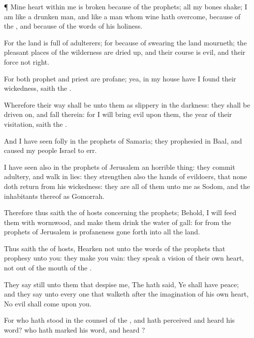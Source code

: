 {\par }{\PP {}¶ Mine
heart
within me is
broken because of the
prophets; all my
bones
shake; I am like a
drunken
man, and like a
man whom
wine hath
overcome,
because of the
{}, and because of the
words of his
holiness.

For the
land is
full of
adulterers; for
because of
swearing the
land
mourneth; the pleasant
places of the
wilderness are dried
up, and their
course is
evil, and their
force
{} not right.

For both
prophet and
priest are
profane; yea, in my
house have I
found their
wickedness,
saith the
{}.

Wherefore their
way shall be unto them as
slippery
{} in the
darkness: they shall be driven
on, and
fall therein: for I will
bring
evil upon them,
{} the
year of their
visitation,
saith the
{}.

And I have
seen
folly in the
prophets of
Samaria; they
prophesied in
Baal, and caused my
people
Israel to
err.

I have
seen also in the
prophets of
Jerusalem an horrible
thing: they commit
adultery, and
walk in
lies: they
strengthen also the
hands of
evildoers, that
none doth
return from his
wickedness: they are all of them unto me as
Sodom, and the
inhabitants thereof as
Gomorrah.

Therefore thus
saith the
{} of
hosts concerning the
prophets; Behold, I will
feed them with
wormwood, and make them
drink the
water of
gall: for from the
prophets of
Jerusalem is
profaneness gone
forth into all the
land.

Thus
saith the
{} of
hosts,
Hearken not unto the
words of the
prophets that
prophesy unto you: they make you
vain: they
speak a
vision of their own
heart,
{} not out of the
mouth of the
{}.

They
say
still unto them that
despise me, The
{} hath
said, Ye shall have
peace; and they
say unto every one that
walketh after the
imagination of his own
heart, No
evil shall
come upon you.

For who hath
stood in the
counsel of the
{}, and hath
perceived and
heard his
word? who hath
marked his
word, and
heard
{}?

}
